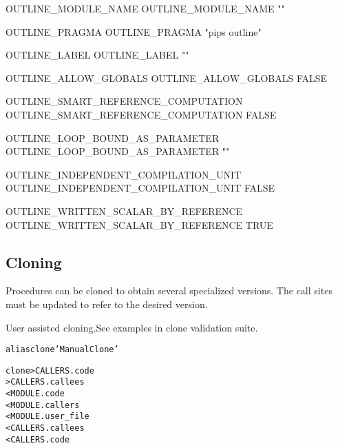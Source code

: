 \documentclass[a4paper]{report}
\newenvironment{PipsMake}{\begin{alltt}}{\end{alltt}}
\newenvironment{PipsPass}[1]{\label{pass:#1}}{}
\begin{document}
\begin{PipsProp}{OUTLINE_MODULE_NAME}
OUTLINE_MODULE_NAME ""
\end{PipsProp}
\begin{PipsProp}{OUTLINE_PRAGMA}
OUTLINE_PRAGMA "pips outline"
\end{PipsProp}
\begin{PipsProp}{OUTLINE_LABEL}
OUTLINE_LABEL ""
\end{PipsProp}
\begin{PipsProp}{OUTLINE_ALLOW_GLOBALS}
OUTLINE_ALLOW_GLOBALS FALSE
\end{PipsProp}
\begin{PipsProp}{OUTLINE_SMART_REFERENCE_COMPUTATION}
OUTLINE_SMART_REFERENCE_COMPUTATION FALSE
\end{PipsProp}
\begin{PipsProp}{OUTLINE_LOOP_BOUND_AS_PARAMETER}
OUTLINE_LOOP_BOUND_AS_PARAMETER ""
\end{PipsProp}
\begin{PipsProp}{OUTLINE_INDEPENDENT_COMPILATION_UNIT}
OUTLINE_INDEPENDENT_COMPILATION_UNIT FALSE
\end{PipsProp}
\begin{PipsProp}{OUTLINE_WRITTEN_SCALAR_BY_REFERENCE}
OUTLINE_WRITTEN_SCALAR_BY_REFERENCE TRUE
\end{PipsProp}


\subsection{Cloning}

\begin{PipsPass}{clone}
Procedures can be cloned to obtain several specialized versions. The
call sites must be updated to refer to the desired version.

User assisted cloning.See examples in clone validation
suite. 
\end{PipsPass}

\begin{PipsMake}

alias clone 'Manual Clone'

clone                   > CALLERS.code
                        > CALLERS.callees
        < MODULE.code
        < MODULE.callers
        < MODULE.user_file
        < CALLERS.callees
        < CALLERS.code
\end{PipsMake}
\end{document}
